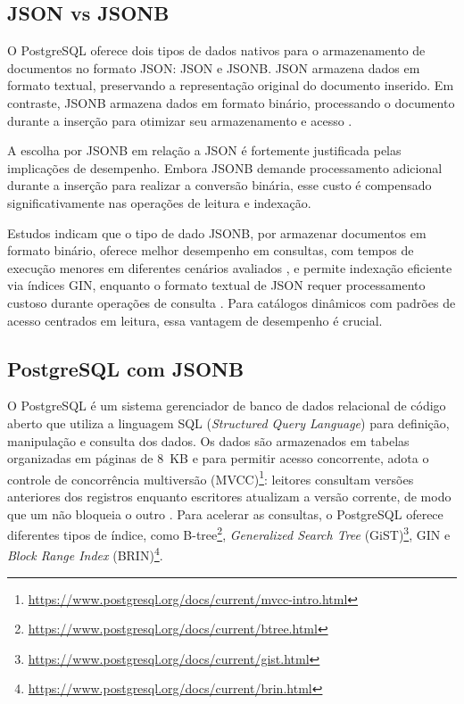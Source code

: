 \subsection{JSON vs JSONB}

O PostgreSQL oferece dois tipos de dados nativos para o armazenamento de documentos no formato JSON: 
JSON e JSONB. JSON armazena dados em formato textual, preservando a representação original 
do documento inserido. Em contraste, JSONB armazena dados em formato binário, processando o 
documento durante a inserção para otimizar seu armazenamento e acesso \cite{Liu2020}.

A escolha por JSONB em relação a JSON é fortemente justificada pelas implicações de 
desempenho. Embora JSONB demande processamento adicional durante a inserção para realizar 
a conversão binária, esse custo é compensado significativamente nas operações de leitura e 
indexação. 

Estudos indicam que o tipo de dado JSONB, por armazenar documentos em formato 
binário, oferece melhor desempenho em consultas, com tempos de execução 
menores em diferentes cenários avaliados \cite{Aji2026}, e permite indexação eficiente via 
índices GIN, enquanto o formato textual de JSON requer processamento custoso durante operações 
de consulta \cite{Liu2020}. Para catálogos dinâmicos com padrões de acesso centrados em leitura, 
essa vantagem de desempenho é crucial.


\subsection{PostgreSQL com JSONB}

O PostgreSQL é um sistema gerenciador de banco de dados relacional de código aberto
que utiliza a linguagem SQL (\textit{Structured Query Language}) para definição,
manipulação e consulta dos dados. Os dados são armazenados em
tabelas organizadas em páginas de 8~KB e para permitir acesso
concorrente, adota o controle de concorrência multiversão (MVCC)\footnote{\url{https://www.postgresql.org/docs/current/mvcc-intro.html}}: leitores consultam
versões anteriores dos registros enquanto escritores atualizam a versão corrente, de modo
que um não bloqueia o outro \cite{Bondugula2024}. Para acelerar as consultas, o PostgreSQL oferece diferentes tipos de
índice, como B-tree\footnote{\url{https://www.postgresql.org/docs/current/btree.html}}, \textit{Generalized Search Tree} (GiST)\footnote{\url{https://www.postgresql.org/docs/current/gist.html}}, GIN e \textit{Block Range Index} (BRIN)\footnote{\url{https://www.postgresql.org/docs/current/brin.html}}.

